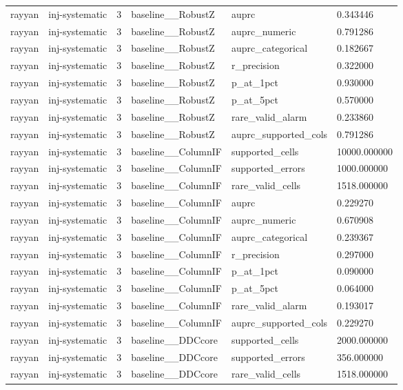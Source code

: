 \begin{tabular}{llllll}
rayyan & inj-systematic & 3 & baseline\_\_RobustZ & auprc & 0.343446 \\
rayyan & inj-systematic & 3 & baseline\_\_RobustZ & auprc\_numeric & 0.791286 \\
rayyan & inj-systematic & 3 & baseline\_\_RobustZ & auprc\_categorical & 0.182667 \\
rayyan & inj-systematic & 3 & baseline\_\_RobustZ & r\_precision & 0.322000 \\
rayyan & inj-systematic & 3 & baseline\_\_RobustZ & p\_at\_1pct & 0.930000 \\
rayyan & inj-systematic & 3 & baseline\_\_RobustZ & p\_at\_5pct & 0.570000 \\
rayyan & inj-systematic & 3 & baseline\_\_RobustZ & rare\_valid\_alarm & 0.233860 \\
rayyan & inj-systematic & 3 & baseline\_\_RobustZ & auprc\_supported\_cols & 0.791286 \\
rayyan & inj-systematic & 3 & baseline\_\_ColumnIF & supported\_cells & 10000.000000 \\
rayyan & inj-systematic & 3 & baseline\_\_ColumnIF & supported\_errors & 1000.000000 \\
rayyan & inj-systematic & 3 & baseline\_\_ColumnIF & rare\_valid\_cells & 1518.000000 \\
rayyan & inj-systematic & 3 & baseline\_\_ColumnIF & auprc & 0.229270 \\
rayyan & inj-systematic & 3 & baseline\_\_ColumnIF & auprc\_numeric & 0.670908 \\
rayyan & inj-systematic & 3 & baseline\_\_ColumnIF & auprc\_categorical & 0.239367 \\
rayyan & inj-systematic & 3 & baseline\_\_ColumnIF & r\_precision & 0.297000 \\
rayyan & inj-systematic & 3 & baseline\_\_ColumnIF & p\_at\_1pct & 0.090000 \\
rayyan & inj-systematic & 3 & baseline\_\_ColumnIF & p\_at\_5pct & 0.064000 \\
rayyan & inj-systematic & 3 & baseline\_\_ColumnIF & rare\_valid\_alarm & 0.193017 \\
rayyan & inj-systematic & 3 & baseline\_\_ColumnIF & auprc\_supported\_cols & 0.229270 \\
rayyan & inj-systematic & 3 & baseline\_\_DDCcore & supported\_cells & 2000.000000 \\
rayyan & inj-systematic & 3 & baseline\_\_DDCcore & supported\_errors & 356.000000 \\
rayyan & inj-systematic & 3 & baseline\_\_DDCcore & rare\_valid\_cells & 1518.000000 \\

\end{tabular}

